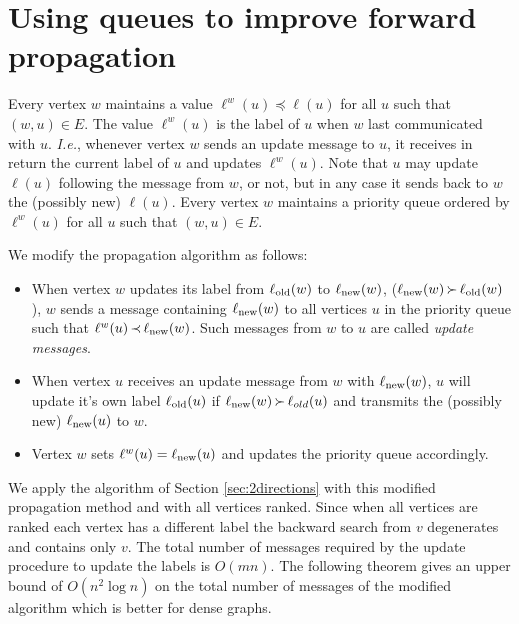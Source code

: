 \documentclass[11pt]{article}
\theoremstyle{plain}
\theoremstyle{definition}
\theoremstyle{remark}
\numberwithin{equation}{section}
\DeclareMathOperator{\glex}{\prec}
\DeclareMathOperator{\geqlex}{\preceq}
\DeclareMathOperator{\llex}{\succ}
\begin{document}
\section{Using queues to improve forward propagation} \label{nsquare:sec}


Every vertex $w$ maintains  a value $\ell^w(u) \geqlex \ell(u)$ for
all $u$ such that $(w,u)\in E$. The value $\ell^w(u)$ is the label
of $u$ when $w$ last communicated with $u$. {\sl I.e.}, whenever
vertex $w$ sends an update message to $u$, it receives in return the
current label of $u$ and updates $\ell^w(u)$. Note that $u$ may
update $\ell(u)$ following the message from $w$, or not, but in any
case it sends back to $w$ the (possibly new) $\ell(u)$. Every vertex
$w$ maintains a priority queue ordered by $\ell^w(u)$ for all $u$
such that $(w,u)\in E$.

We modify the propagation algorithm as follows: \begin{itemize} \item When vertex $w$ updates its label from $\ell_{{\rm old}}(w)$ to $\ell_{{\rm new}}(w)$,  ($\ell_{{\rm new}}(w)\llex \ell_{{\rm old}}(w)$), $w$ sends a message containing $\ell_{{\rm new}}(w)$ to all vertices $u$ in the priority queue such that $\ell^w(u) \glex \ell_{{\rm new}}(w)$. Such messages from $w$ to $u$ are called {\sl update messages}.
\item When vertex $u$ receives an update message from $w$ with $\ell_{{\rm new}}(w)$, $u$ will
 update it's own label $\ell_{\rm old}(u)$ if $\ell_{{\rm new}}(w)\llex \ell_{old}(u)$ and transmits the (possibly new) $\ell_{\rm new}(u)$ to $w$.
 \item Vertex $w$ sets $\ell^w(u)=\ell_{\rm new}(u)$ and updates the priority queue accordingly.
 \end{itemize}

We apply the algorithm of Section \ref{sec:2directions} with this
modified propagation method and with all vertices ranked. Since when
all vertices are ranked each vertex has a different label the
backward search from $v$ degenerates and contains only $v$. The
total number of messages required by the update procedure to update
the labels is $O(mn)$. The following theorem gives an
 upper bound of $O(n^2 \log n)$ on the total number of messages of
 the modified algorithm which is better for dense graphs.
\end{document}
